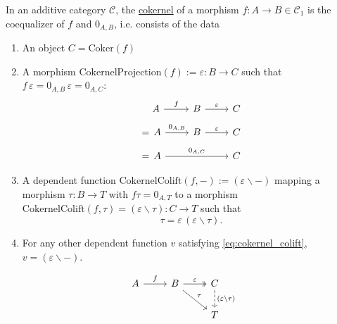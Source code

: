 \begin{definition}[Cokernel]
In an additive category $\mathcal{C}$, the \ul{cokernel} of a morphism $f : A \rightarrow B \in \mathcal{C}_{1}$ is the coequalizer of
$f$ and $0_{A,B}$, i.e. consists of the data
\begin{enumerate}
\renewcommand{\labelenumi}{(\theenumi)}
\item An object $C = \mathrm{Coker}(f)$
\item A morphism $\mathrm{CokernelProjection}(f) := \varepsilon : B \rightarrow C$ such that $f\,\varepsilon = 0_{A,B}\,\varepsilon = 0_{A,C}$:
\begin{align*}
\begin{tikzcd}[
  ampersand replacement=\&,
  row sep=1em,
]
{\phantom{=\, }A} \arrow[r, "f"]                 \& B \arrow[r, "\varepsilon"] \& C \\
{=\, A} \arrow[r, "{0_{A,B}}"]   \& B \arrow[r, "\varepsilon"] \& C \\
{= \, A} \arrow[rr, "{0_{A,C}}"] \&                            \& C
\end{tikzcd}
\end{align*}
\item A dependent function $\mathrm{CokernelColift}(f,-) := ( \varepsilon \backslash -)$ mapping a morphism $\tau : B \rightarrow T$ with
$f \tau  = 0_{A,T}$ to a morphism $\mathrm{CokernelColift}(f,\tau) = ( \varepsilon \backslash \tau) : C \rightarrow T$ such that
\[
\tau =\label{eq:cokernel_colift} \varepsilon \, (\varepsilon \backslash \tau).
\]
\item For any other dependent function $v$ satisfying \eqref{eq:cokernel_colift}, $v = ( \varepsilon \backslash - )$.
\end{enumerate}
\[
\begin{tikzcd}
A \arrow[r, "f"] & B \arrow[r, "\varepsilon", two heads] \arrow[rd, "\tau"] & C \arrow[d, "(\varepsilon\backslash\tau)", dashed] \\
                 &                                                          & T                                                 
\end{tikzcd}
\]
\end{definition}

